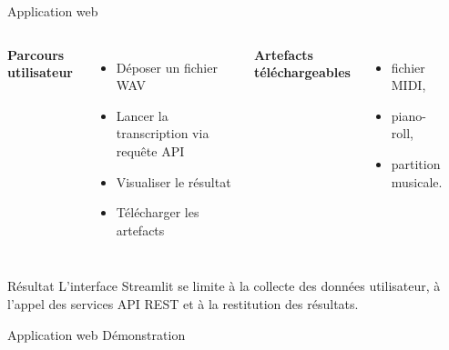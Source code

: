 \begin{frame}{Application web}
	\begin{columns}[T]
		
		\textbf{Parcours utilisateur}
		\begin{itemize}
			\item Déposer un fichier WAV
			\item Lancer la transcription via requête API
			\item Visualiser le résultat
			\item Télécharger les artefacts
		\end{itemize}
		
		\vspace{0.1cm}
		
		\textbf{Artefacts téléchargeables}
		\begin{itemize}
			\item fichier MIDI,
			\item piano-roll,
			\item partition musicale.
		\end{itemize}
		
		
		\begin{center}
		\end{center}
	\end{columns}
	
	\vspace{0.2cm}
	
	\begin{block}{Résultat}
		L'interface Streamlit se limite à la collecte des données utilisateur, à l'appel des services API REST et à la restitution des résultats.
	\end{block}
\end{frame}

\begin{frame}{Application web}
	\centering
	\Large Démonstration
	
	\vspace{0.4cm}
	
	\href{https://huggingface.co/spaces/DamienDESSAUX/M2i_CDSD_Projet_Deployment}{}
\end{frame}